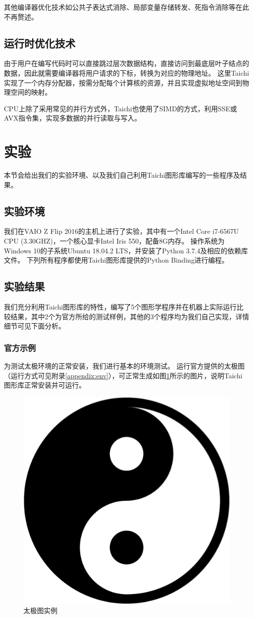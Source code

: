 \documentclass[thesis]{thesis}
\begin{document}
其他编译器优化技术如公共子表达式消除、局部变量存储转发、死指令消除等在此不再赘述。

\subsection{运行时优化技术}
由于用户在编写代码时可以直接跳过层次数据结构，直接访问到最底层叶子结点的数据，因此就需要编译器将用户请求的下标，转换为对应的物理地址。
这里Taichi实现了一个内存分配器，按需分配每个计算核的资源，并且实现虚拟地址空间到物理空间的映射。

CPU上除了采用常见的并行方式外，Taichi也使用了SIMD的方式，利用SSE或AVX指令集，实现多数据的并行读取与写入。

\section{实验}
\label{sec:exp}
本节会给出我们的实验环境、以及我们自己利用Taichi图形库编写的一些程序及结果。

\subsection{实验环境}
我们在VAIO Z Flip 2016的主机上进行了实验，其中有一个Intel Core i7-6567U CPU (3.30GHZ)，一个核心显卡Intel Iris 550，配备8G内存。
操作系统为Windows 10的子系统Ubuntu 18.04.2 LTS，并安装了Python 3.7.4及相应的依赖库文件。
下列所有程序都使用Taichi图形库提供的Python Binding进行编程。

\subsection{实验结果}
我们充分利用Taichi图形库的特性，编写了5个图形学程序并在机器上实际运行比较结果，其中2个为官方所给的测试样例，其他的3个程序均为我们自己实现，详情细节可见下面分析。

\subsubsection{官方示例}
为测试太极环境的正常安装，我们进行基本的环境测试。
运行官方提供的太极图（运行方式可见附录\ref{appendix:env}），可正常生成如图\ref{fig:taichi}所示的图片，说明Taichi图形库正常安装并可运行。
\begin{figure}[htbp]
\centering
\includegraphics[width=0.3\linewidth]{fig/taichi.jpg}
\caption{太极图实例\protect\footnotemark}
\label{fig:taichi}
\end{figure}
\end{document}
